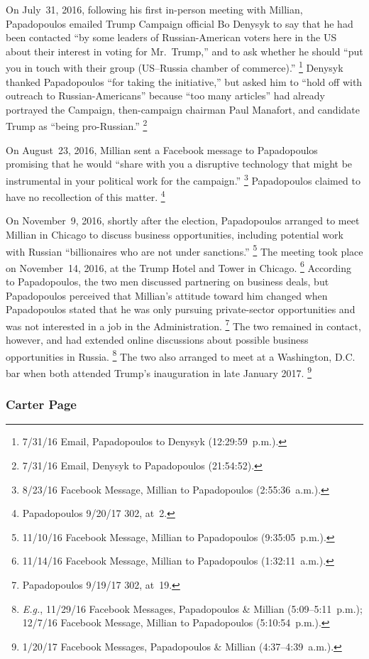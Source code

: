 On July~31, 2016, following his first in-person meeting with Millian, Papadopoulos emailed Trump Campaign official Bo Denysyk to say that he had been contacted ``by some leaders of Russian-American voters here in the US about their interest in voting for Mr.~Trump,'' and to ask whether he should ``put you in touch with their group (US--Russia chamber of commerce).''%
\footnote{7/31/16 Email, Papadopoulos to Denysyk (12:29:59~p.m.).}
Denysyk thanked Papadopoulos ``for taking the initiative,'' but asked him to ``hold off with outreach to Russian-Americans'' because ``too many articles'' had already portrayed the Campaign, then-campaign chairman Paul Manafort, and candidate Trump as ``being pro-Russian.''%
\footnote{7/31/16 Email, Denysyk to Papadopoulos (21:54:52).}

On August~23, 2016, Millian sent a Facebook message to Papadopoulos promising that he would ``share with you a disruptive technology that might be instrumental in your political work for the campaign.''%
\footnote{8/23/16 Facebook Message, Millian to Papadopoulos (2:55:36~a.m.).}
Papadopoulos claimed to have no recollection of this matter.%
\footnote{Papadopoulos 9/20/17 302, at~2.}

On November~9, 2016, shortly after the election, Papadopoulos arranged to meet Millian in Chicago to discuss business opportunities, including potential work with Russian ``billionaires who are not under sanctions.''%
\footnote{11/10/16 Facebook Message, Millian to Papadopoulos (9:35:05~p.m.).}
The meeting took place on November~14, 2016, at the Trump Hotel and Tower in Chicago.%
\footnote{11/14/16 Facebook Message, Millian to Papadopoulos (1:32:11~a.m.).}
According to Papadopoulos, the two men discussed partnering on business deals, but Papadopoulos perceived that Millian's attitude toward him changed when Papadopoulos stated that he was only pursuing private-sector opportunities and was not interested in a job in the Administration.%
\footnote{Papadopoulos 9/19/17 302, at~19.}
The two remained in contact, however, and had extended online discussions about possible business opportunities in Russia.%
\footnote{\textit{E.g.}, 11/29/16 Facebook Messages, Papadopoulos \& Millian (5:09--5:11~p.m.);
12/7/16 Facebook Message, Millian to Papadopoulos (5:10:54~p.m.).}
The two also arranged to meet at a Washington, D.C. bar when both attended Trump's inauguration in late January 2017.%
\footnote{1/20/17 Facebook Messages, Papadopoulos \& Millian (4:37--4:39~a.m.).}

\subsubsection{Carter Page}

